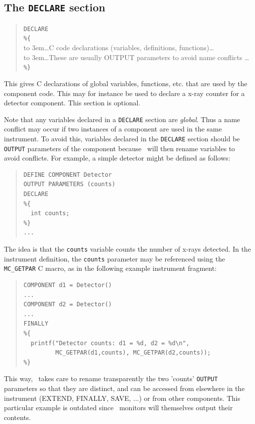\subsection{The \texttt{DECLARE} section}
\label{s:comp-declare}
\begin{quote}
  \texttt{DECLARE} \\
  \verb|%{| \\
  \hbox to 3em{}\ldots C code declarations (variables, definitions, functions)\ldots \\
  \hbox to 3em{}\ldots These are usually OUTPUT parameters to avoid name conflicts \ldots \\
  \verb|%}|
\end{quote}
This gives C declarations of global variables, functions, etc. that are used by the
component code. This may for instance be used to declare a x-ray
counter for a detector component. This section is optional.

Note that any variables declared in a \verb+DECLARE+ section are
\emph{global}. Thus a name conflict may occur if two instances of a
component are used in the same instrument. To avoid this, variables
declared in the \texttt{DECLARE} section should be \texttt{OUTPUT} parameters of
the component because \MCX\ will then rename variables to avoid conflicts.
For example, a simple detector might be defined as follows:
\begin{quote}
\begin{verbatim}
DEFINE COMPONENT Detector
OUTPUT PARAMETERS (counts)
DECLARE
%{
  int counts;
%}
...
\end{verbatim}
\end{quote}
The idea is that the \texttt{counts} variable counts the number of
x-rays detected. In the instrument definition, the \texttt{counts}
parameter may be referenced using the \verb+MC_GETPAR+ C macro, as in
the following example instrument fragment:\label{mcgetpar}
\begin{quote}
\begin{verbatim}
COMPONENT d1 = Detector()
...
COMPONENT d2 = Detector()
...
FINALLY
%{
  printf("Detector counts: d1 = %d, d2 = %d\n",
         MC_GETPAR(d1,counts), MC_GETPAR(d2,counts));
%}
\end{verbatim}
\end{quote}
This way, \MCX\ takes care to rename transparently the two 'counts'
\texttt{OUTPUT} parameters so that they are distinct, and can be
accessed from elsewhere in the instrument (EXTEND, FINALLY, SAVE, ...)
or from other components. This particular example is outdated since
\MCX\ monitors will themselves output their contents.

